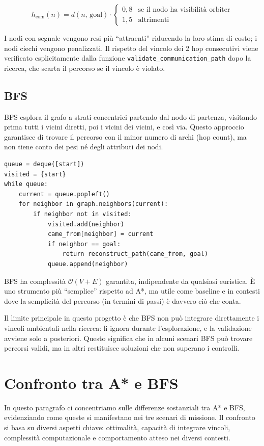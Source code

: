 \documentclass[11pt,a4paper]{article}
\begin{document}
\[
  h_{\text{com}}(n) = d(n,\,\text{goal}) \cdot
  \begin{cases}
    0{,}8 & \text{se il nodo ha visibilità orbiter} \\
    1{,}5 & \text{altrimenti}
  \end{cases}
\]

I nodi con segnale vengono resi più ``attraenti'' riducendo la loro stima di costo; i nodi ciechi vengono penalizzati. Il rispetto del vincolo dei 2 hop consecutivi viene verificato esplicitamente dalla funzione \texttt{validate\_communication\_path} dopo la ricerca, che scarta il percorso se il vincolo è violato.
\subsection{BFS}

BFS esplora il grafo a strati concentrici partendo dal nodo di partenza, visitando prima tutti i vicini diretti, poi i vicini dei vicini, e così via. Questo approccio garantisce di trovare il percorso con il minor numero di archi (hop count), ma non tiene conto dei pesi né degli attributi dei nodi.

\begin{lstlisting}[caption={Nucleo del loop BFS}]
queue = deque([start])
visited = {start}
while queue:
    current = queue.popleft()
    for neighbor in graph.neighbors(current):
        if neighbor not in visited:
            visited.add(neighbor)
            came_from[neighbor] = current
            if neighbor == goal:
                return reconstruct_path(came_from, goal)
            queue.append(neighbor)
\end{lstlisting}

BFS ha complessità $\mathcal{O}(V + E)$ garantita, indipendente da qualsiasi euristica. È uno strumento più ``semplice'' rispetto ad A*, ma utile come baseline e in contesti dove la semplicità del percorso (in termini di passi) è davvero ciò che conta.

Il limite principale in questo progetto è che BFS non può integrare direttamente i vincoli ambientali nella ricerca: li ignora durante l'esplorazione, e la validazione avviene solo a posteriori. Questo significa che in alcuni scenari BFS può trovare percorsi validi, ma in altri restituisce soluzioni che non superano i controlli.


\section{Confronto tra A* e BFS}
In questo paragrafo ci concentriamo sulle differenze sostanziali tra A* e BFS, evidenziando come queste si manifestano nei tre scenari di missione. Il confronto si basa su diversi aspetti chiave: ottimalità, capacità di integrare vincoli, complessità computazionale e comportamento atteso nei diversi contesti.
\end{document}

